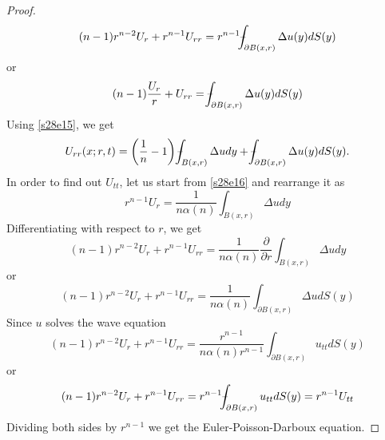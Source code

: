 \documentclass{article}
\newcommand{\fint}{\mbox{--}\mkern-16mu\int}
\theoremstyle{plain}
\numberwithin{thm}{section}
\theoremstyle{plain}
\numberwithin{prop}{section}
\theoremstyle{definition}
\numberwithin{defn}{section}
\theoremstyle{remark}
\numberwithin{equation}{section}
\begin{document}
\begin{proof}
\[
(n-1)r^{n-2}U_r + r^{n-1}U_{rr} = r^{n-1} \fint_{\partial B(x,r)} \Delta u(y)dS(y)
\]
or
\[
(n-1)\frac{U_r}{r} + U_{rr} = \fint_{\partial B(x,r)} \Delta u(y)dS(y)
\]
Using \eqref{s28e15}, we get
\begin{equation}\label{s28e17}
U_{rr}(x;r,t) = \left(\frac{1}{n} - 1\right)\fint_{B(x,r)} \Delta u dy + \fint_{\partial B(x,r)} \Delta u(y)dS(y).
\end{equation}
In order to find out $U_{tt}$, let us start from \eqref{s28e16} and rearrange it as
\[
r^{n-1}U_r = \frac{1}{n\alpha(n)}\int_{B(x,r)}\Delta u dy
\]
Differentiating with respect to $r$, we get
\[
(n-1)r^{n-2}U_r + r^{n-1}U_{rr} = \frac{1}{n\alpha(n)}\frac{\partial}{\partial r}\int_{B(x,r)}\Delta u dy
\]
or
\[
(n-1)r^{n-2}U_r + r^{n-1}U_{rr} = \frac{1}{n\alpha(n)}\int_{\partial B(x,r)}\Delta u dS(y)
\]
Since $u$ solves the wave equation
\[
(n-1)r^{n-2}U_r + r^{n-1}U_{rr} = \frac{r^{n-1}}{n\alpha(n)r^{n-1}}\int_{\partial B(x,r)}u_{tt} dS(y)
\]
or
\begin{equation}\label{s28e18}
(n-1)r^{n-2}U_r + r^{n-1}U_{rr} = r^{n-1}\fint_{\partial B(x,r)}u_{tt}dS(y) = r^{n-1}U_{tt}
\end{equation}
Dividing both sides by $r^{n-1}$ we get the Euler-Poisson-Darboux equation.
\end{proof}
\end{document}
